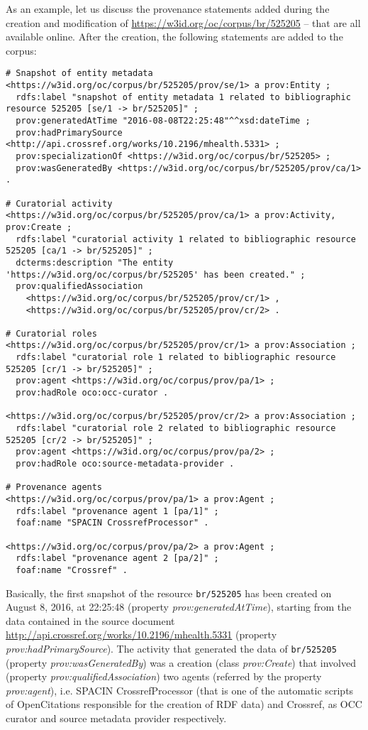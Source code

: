 \documentclass[runningheads,a4paper]{llncs}
\begin{document}
As an example, let us discuss the provenance statements added during the creation and modification of \url{https://w3id.org/oc/corpus/br/525205} -- that are all available online. After the creation, the following statements are added to the corpus:

\begin{lstlisting}[mathescape]
# Snapshot of entity metadata
<https://w3id.org/oc/corpus/br/525205/prov/se/1> a prov:Entity ;
  rdfs:label "snapshot of entity metadata 1 related to bibliographic resource 525205 [se/1 -> br/525205]" ;
  prov:generatedAtTime "2016-08-08T22:25:48"^^xsd:dateTime ;
  prov:hadPrimarySource <http://api.crossref.org/works/10.2196/mhealth.5331> ;
  prov:specializationOf <https://w3id.org/oc/corpus/br/525205> ;
  prov:wasGeneratedBy <https://w3id.org/oc/corpus/br/525205/prov/ca/1> .

# Curatorial activity
<https://w3id.org/oc/corpus/br/525205/prov/ca/1> a prov:Activity, prov:Create ;
  rdfs:label "curatorial activity 1 related to bibliographic resource 525205 [ca/1 -> br/525205]" ;
  dcterms:description "The entity 'https://w3id.org/oc/corpus/br/525205' has been created." ;
  prov:qualifiedAssociation 
    <https://w3id.org/oc/corpus/br/525205/prov/cr/1> ,
    <https://w3id.org/oc/corpus/br/525205/prov/cr/2> .

# Curatorial roles
<https://w3id.org/oc/corpus/br/525205/prov/cr/1> a prov:Association ;
  rdfs:label "curatorial role 1 related to bibliographic resource 525205 [cr/1 -> br/525205]" ;
  prov:agent <https://w3id.org/oc/corpus/prov/pa/1> ;
  prov:hadRole oco:occ-curator .

<https://w3id.org/oc/corpus/br/525205/prov/cr/2> a prov:Association ;
  rdfs:label "curatorial role 2 related to bibliographic resource 525205 [cr/2 -> br/525205]" ;
  prov:agent <https://w3id.org/oc/corpus/prov/pa/2> ;
  prov:hadRole oco:source-metadata-provider .

# Provenance agents
<https://w3id.org/oc/corpus/prov/pa/1> a prov:Agent ;
  rdfs:label "provenance agent 1 [pa/1]" ;
  foaf:name "SPACIN CrossrefProcessor" .

<https://w3id.org/oc/corpus/prov/pa/2> a prov:Agent ;
  rdfs:label "provenance agent 2 [pa/2]" ;
  foaf:name "Crossref" .
\end{lstlisting}

Basically, the first snapshot of the resource \Verb+br/525205+ has been created on August 8, 2016, at 22:25:48 (property {\em prov:generatedAtTime}), starting from the data contained in the source document \url{http://api.crossref.org/works/10.2196/mhealth.5331} (property {\em prov:hadPrimarySource}). The activity that generated the data of \Verb+br/525205+ (property {\em prov:wasGeneratedBy}) was a creation (class {\em prov:Create}) that involved (property {\em prov:qualifiedAssociation}) two agents (referred by the property {\em prov:agent}), i.e. SPACIN CrossrefProcessor (that is one of the automatic scripts of OpenCitations responsible for the creation of RDF data) and Crossref, as OCC curator and source metadata provider respectively.
\end{document}
